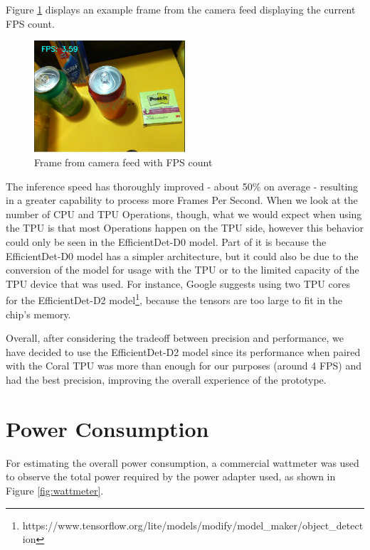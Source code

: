 \documentclass[openright]{normas-utf-tex} %
\begin{document}
Figure \ref{fig:framecount} displays an example frame from the camera feed displaying the 
current FPS count.

\begin{figure}[H]
	\centering
	\includegraphics[width=0.5\textwidth]{./images/frameratemeasurement.png}
    \caption[Frame from camera feed with FPS count]{Frame from camera feed with FPS count}
    \label{fig:framecount}
\end{figure}

The inference speed has thoroughly improved - about 50\% on average - resulting
in a greater capability to process more Frames Per Second. When we look at the
number of CPU and TPU Operations, though, what we would expect when using the
TPU is that most Operations happen on the TPU side, however this behavior could
only be seen in the EfficientDet-D0 model. Part of it is because the
EfficientDet-D0 model has a simpler architecture, but it could also be due to
the conversion of the model for usage with the TPU or to the limited capacity
of the TPU device that was used. For instance, Google suggests using two TPU
cores for the EfficientDet-D2
model\footnote{https://www.tensorflow.org/lite/models/modify/model\_maker/object\_detection},
because the tensors are too large to fit in the chip's memory.

Overall, after considering the tradeoff between precision and performance, we
have decided to use the EfficientDet-D2 model since its performance when paired
with the Coral TPU was more than enough for our purposes (around 4 FPS) and had
the best precision, improving the overall experience of the prototype.

\section{Power Consumption}

For estimating the overall power consumption, a commercial wattmeter was used
to observe the total power required by the power adapter used, as shown in
Figure \ref{fig:wattmeter}.
\end{document}
